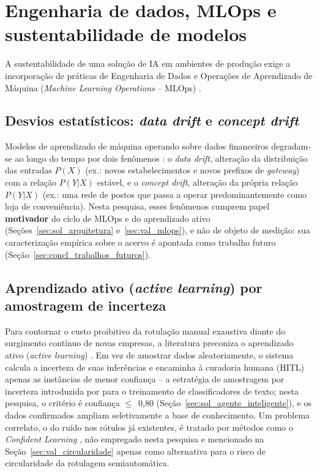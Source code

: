 \section{Engenharia de dados, MLOps e sustentabilidade de modelos}
\label{sec:fund_mlops}

A sustentabilidade de uma solução de IA em ambientes de produção exige a incorporação de práticas de Engenharia de Dados e Operações de Aprendizado de Máquina (\textit{Machine Learning Operations} -- MLOps) \cite{kreuzberger2022mlops, treveil2020mlops}.

\subsection{Desvios estatísticos: \textit{data drift} e \textit{concept drift}}
\label{sec:fund_drift}
Modelos de aprendizado de máquina operando sobre dados financeiros degradam-se ao longo do tempo por dois fenômenos \cite{quinonero2008dataset, Lu2019LearningConceptDriftReview}: o \textit{data drift}, alteração da distribuição das entradas $P(X)$ (ex.: novos estabelecimentos e novos prefixos de \textit{gateway}) com a relação $P(Y|X)$ estável, e o \textit{concept drift}, alteração da própria relação $P(Y|X)$ (ex.: uma rede de postos que passa a operar predominantemente como loja de conveniência). Nesta pesquisa, esses fenômenos cumprem papel \textbf{motivador} do ciclo de MLOps e do aprendizado ativo (Seções~\ref{sec:sol_arquitetura} e~\ref{sec:val_mlops}), e não de objeto de medição: sua caracterização empírica sobre o acervo é apontada como trabalho futuro (Seção~\ref{sec:concl_trabalhos_futuros}).

\subsection{Aprendizado ativo (\textit{active learning}) por amostragem de incerteza}
Para contornar o custo proibitivo da rotulação manual exaustiva diante do surgimento contínuo de novas empresas, a literatura preconiza o aprendizado ativo (\textit{active learning}) \cite{ren2021aprendizagem}. Em vez de amostrar dados aleatoriamente, o sistema calcula a incerteza de suas inferências e encaminha à curadoria humana (HITL) apenas as instâncias de menor confiança -- a estratégia de amostragem por incerteza introduzida por  para o treinamento de classificadores de texto; nesta pesquisa, o critério é confiança $\le$~0,80 (Seção~\ref{sec:sol_agente_inteligente}), e os dados confirmados ampliam seletivamente a base de conhecimento. Um problema correlato, o do ruído nos rótulos já existentes, é tratado por métodos como o \textit{Confident Learning} \cite{northcutt2021aprendizagem}, não empregado nesta pesquisa e mencionado na Seção~\ref{sec:val_circularidade} apenas como alternativa para o risco de circularidade da rotulagem semiautomática.

